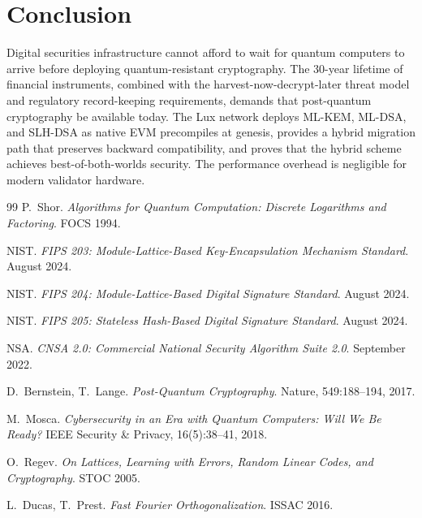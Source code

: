\section{Conclusion}

\label{sec:conclusion}

Digital securities infrastructure cannot afford to wait for quantum
computers to arrive before deploying quantum-resistant cryptography.
The 30-year lifetime of financial instruments, combined with the
harvest-now-decrypt-later threat model and regulatory record-keeping
requirements, demands that post-quantum cryptography be available today.
The Lux network deploys ML-KEM, ML-DSA, and SLH-DSA as native EVM
precompiles at genesis, provides a hybrid migration path that preserves
backward compatibility, and proves that the hybrid scheme achieves
best-of-both-worlds security.  The performance overhead is negligible
for modern validator hardware.

\begin{thebibliography}{99}
P.~Shor.
\emph{Algorithms for Quantum Computation: Discrete Logarithms and
Factoring}.
FOCS 1994.

NIST.
\emph{FIPS 203: Module-Lattice-Based Key-Encapsulation Mechanism
Standard}.
August 2024.

NIST.
\emph{FIPS 204: Module-Lattice-Based Digital Signature Standard}.
August 2024.

NIST.
\emph{FIPS 205: Stateless Hash-Based Digital Signature Standard}.
August 2024.

NSA.
\emph{CNSA 2.0: Commercial National Security Algorithm Suite 2.0}.
September 2022.

D.~Bernstein, T.~Lange.
\emph{Post-Quantum Cryptography}.
Nature, 549:188--194, 2017.

M.~Mosca.
\emph{Cybersecurity in an Era with Quantum Computers: Will We Be Ready?}
IEEE Security \& Privacy, 16(5):38--41, 2018.

O.~Regev.
\emph{On Lattices, Learning with Errors, Random Linear Codes, and
Cryptography}.
STOC 2005.

L.~Ducas, T.~Prest.
\emph{Fast Fourier Orthogonalization}.
ISSAC 2016.
\end{thebibliography}

